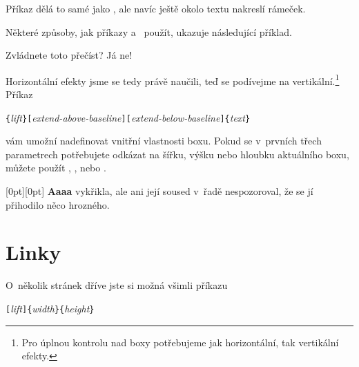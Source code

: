 Příkaz  dělá to samé jako , ale navíc ještě okolo
textu nakreslí rámeček.

Některé způsoby, jak příkazy  a~ použít, ukazuje následující příklad.

\begin{example}
\par
{}\par
{} \par
{} \par
{} 
Zvládnete toto přečíst? Já ne!
\end{example}

Horizontální efekty jsme se tedy právě naučili, teď se podívejme
na vertikální.\footnote{Pro úplnou kontrolu nad boxy potřebujeme
jak horizontální, tak vertikální efekty.} Příkaz

\begin{lscommand}
\verb|{|\emph{lift}\verb|}[|\emph{extend-above-baseline}\verb|][|\emph{extend-below-baseline}\verb|]{|\emph{text}\verb|}|
\end{lscommand}

\noindent vám umožní nadefinovat vnitřní vlastnosti boxu.
Pokud se v~prvních třech parametrech potřebujete odkázat na šířku,
výšku nebo hloubku aktuálního boxu, můžete použít , ,
 nebo .

\begin{example}
\raisebox{0pt}[0pt][0pt]{\Large%
\textbf{
Aaaa\raisebox{-0.3ex}{a}%
\raisebox{-0.7ex}{aa}%
\raisebox{-1.2ex}{r}%
\raisebox{-2.2ex}{g}%
\raisebox{-4.5ex}{h}}}
vykřikla, ale ani její soused
v~řadě nespozoroval, že se jí
přihodilo něco hrozného.
\end{example}

\section{Linky}
\label{sec:rule}

O~několik stránek dříve jste si možná všimli příkazu

\begin{lscommand}
\verb|[|\emph{lift}\verb|]{|\emph{width}\verb|}{|\emph{height}\verb|}|
\end{lscommand}

